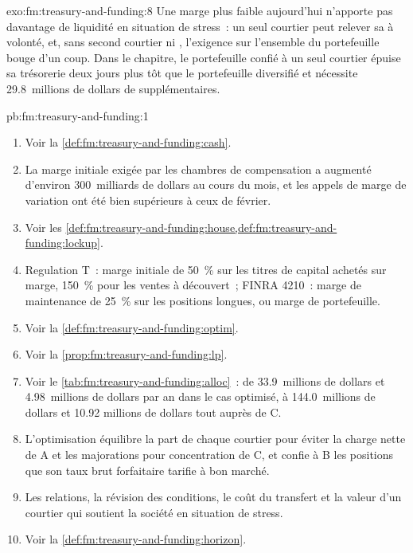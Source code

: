 \begin{solution}{exo:fm:treasury-and-funding:8}
Une marge plus faible aujourd'hui n'apporte pas davantage de liquidité en situation de stress~: un seul courtier peut relever sa  à volonté, et, sans second courtier ni ,
l'exigence sur l'ensemble du portefeuille bouge d'un coup. Dans le chapitre, le portefeuille confié à un seul courtier épuise sa trésorerie deux jours plus tôt que le portefeuille diversifié et nécessite
29.8~millions de dollars de  supplémentaires.
\end{solution}

\begin{solution}{pb:fm:treasury-and-funding:1}
\begin{enumerate}
\item Voir la \cref{def:fm:treasury-and-funding:cash}.
\item La marge initiale exigée par les chambres de compensation a augmenté d'environ 300~milliards de dollars au cours du mois, et les appels de marge de variation ont été bien supérieurs à ceux de février.
\item Voir les \cref{def:fm:treasury-and-funding:house,def:fm:treasury-and-funding:lockup}.
\item Regulation T~: marge initiale de 50~\% sur les titres de capital achetés sur marge, 150~\% pour les ventes à découvert~; FINRA 4210~: marge de maintenance de 25~\% sur les positions longues, ou marge de
portefeuille.
\item Voir la \cref{def:fm:treasury-and-funding:optim}.
\item Voir la \cref{prop:fm:treasury-and-funding:lp}.
\item Voir le \cref{tab:fm:treasury-and-funding:alloc}~: de 33.9~millions de dollars et 4.98~millions de dollars par an dans le cas optimisé, à 144.0~millions de dollars et 10.92
millions de dollars tout auprès de C.
\item L'optimisation équilibre la part de chaque courtier pour éviter la charge nette de A et les majorations pour concentration de C, et confie à B les positions que son taux brut forfaitaire tarifie à bon marché.
\item Les relations, la révision des conditions, le coût du transfert et la valeur d'un courtier qui soutient la société en situation de stress.
\item Voir la \cref{def:fm:treasury-and-funding:horizon}.

\end{enumerate}
\end{solution}
